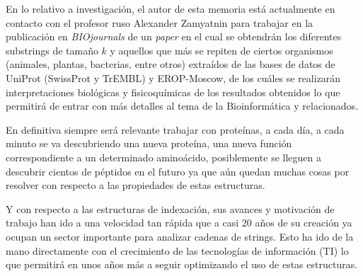 En lo relativo a investigación, el autor de esta memoria está actualmente en contacto con el profesor ruso Alexander Zamyatnin para trabajar en la publicación en \textit{BIOjournals} de un \textit{paper} en el cual se obtendrán los diferentes substrings de tamaño $k$ y aquellos que más se repiten de ciertos organismos (animales, plantas, bacterias, entre otros) extraídos de las bases de datos de UniProt (SwissProt y TrEMBL) y EROP-Moscow, de los cuáles se realizarán interpretaciones biológicas y fisicoquímicas de los resultados obtenidos lo que permitirá de entrar con más detalles al tema de la Bioinformática y relacionados.

En definitiva siempre será relevante trabajar con proteínas, a cada día, a cada minuto se va descubriendo una nueva proteína, una nueva función correspondiente a un determinado aminoácido, posiblemente se lleguen a descubrir cientos de péptidos en el futuro ya que aún quedan muchas cosas por resolver con respecto a las propiedades de estas estructuras.

Y con respecto a las estructuras de indexación, sus avances y motivación de trabajo han ido a una velocidad tan rápida que a casi 20 años de su creación ya ocupan un sector importante para analizar cadenas de strings. Esto ha ido de la mano directamente con el crecimiento de las tecnologías de información (TI) lo que permitirá en unos años más a seguir optimizando el uso de estas estructuras.
